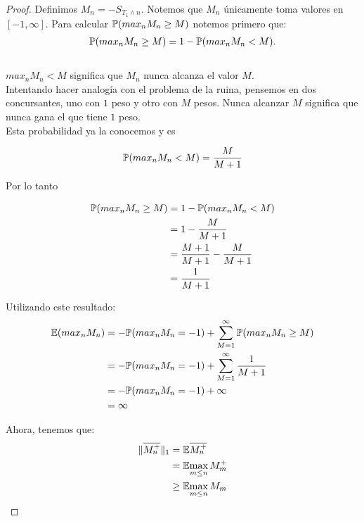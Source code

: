 \begin{proof}
		Definimos $M_n = -S_{T_1 \wedge n}$. Notemos que $M_n$ únicamente toma valores en $[-1, \infty]$.
		Para calcular $\mathbb{P}(max_n M_n \geq M)$ notemos primero que:
		\begin{align}
			\mathbb{P}(max_n M_n \geq M) = 1 - \mathbb{P}(max_n M_n < M).
		\end{align}\\
		
		$max_n M_n < M$ significa que $M_n$ nunca alcanza el valor $M$.\\
		 
		Intentando hacer analogía con el problema de la ruina, pensemos en dos concursantes,
		uno con $1$ peso y otro con $M$ pesos. Nunca alcanzar $M$ significa que nunca gana el que tiene $1$ peso.\\
		
		Esta probabilidad ya la conocemos y es 
		
		\begin{align*}
			\mathbb{P}(max_n M_n < M) = \frac{M}{M + 1}
		\end{align*}
			
		Por lo tanto
		
		\begin{align}
			\mathbb{P}(max_n M_n \geq M) 	&= 1 - \mathbb{P}(max_n M_n < M) \\
									&= 1 - \frac{M}{M + 1}\\
									&= \frac{M+1}{M+1} - \frac{M}{M + 1}\\
									&= \frac{1}{M+1}
		\end{align}
		
		Utilizando este resultado:
		\begin{align} \label{problema1_3:esperanza_del_maximo_de_M_n}
			\mathbb{E}(max_n M_n) 	&= - \mathbb{P}(max_n M_n = -1) + \sum_{M=1}^{\infty} \mathbb{P}(max_n M_n \geq M) \\
							&= - \mathbb{P}(max_n M_n = -1) + \sum_{M=1}^{\infty} \frac{1}{M+1} \\ 
							&= - \mathbb{P}(max_n M_n = -1) + \infty \\
							&= \infty
		\end{align}						
		
		Ahora, tenemos que:
		\begin{align}
			\|\overline{M_{n}^{+}}\|_1  &=    \mathbb{E}{\overline{M_{n}^{+}}} \\
										&=    \mathbb{E}{\max_{m \leq n}M_m^+} \\
										&\geq \mathbb{E}{\max_{m \leq n}M_m}										
		\end{align}
			

\end{proof}
